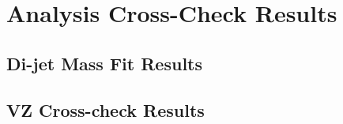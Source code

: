 \chapter{Analysis Cross-Check Results}
\section{Di-jet Mass Fit Results}%
\label{sec:mbb-results}

\section{VZ Cross-check Results}%
\label{sec:VZ-results}

